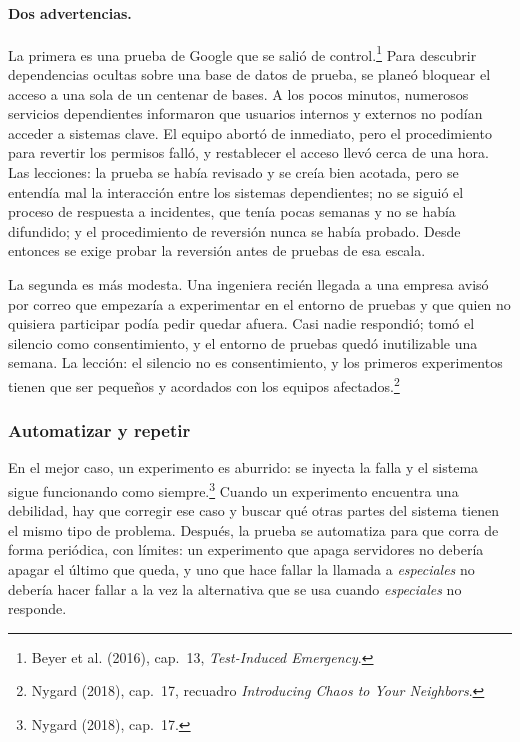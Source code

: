 \documentclass[variant=apuntes,cover=institutional,mode=screen]{ua-engineering-v6-article}
\begin{document}
\paragraph{Dos advertencias.} La primera es una prueba de Google que se salió de control.\footnote{Beyer et al. (2016), cap.~13, \emph{Test-Induced Emergency}.} Para descubrir dependencias ocultas sobre una base de datos de prueba, se planeó bloquear el acceso a una sola de un centenar de bases. A los pocos minutos, numerosos servicios dependientes informaron que usuarios internos y externos no podían acceder a sistemas clave. El equipo abortó de inmediato, pero el procedimiento para revertir los permisos falló, y restablecer el acceso llevó cerca de una hora. Las lecciones: la prueba se había revisado y se creía bien acotada, pero se entendía mal la interacción entre los sistemas dependientes; no se siguió el proceso de respuesta a incidentes, que tenía pocas semanas y no se había difundido; y el procedimiento de reversión nunca se había probado. Desde entonces se exige probar la reversión antes de pruebas de esa escala.

La segunda es más modesta. Una ingeniera recién llegada a una empresa avisó por correo que empezaría a experimentar en el entorno de pruebas y que quien no quisiera participar podía pedir quedar afuera. Casi nadie respondió; tomó el silencio como consentimiento, y el entorno de pruebas quedó inutilizable una semana. La lección: el silencio no es consentimiento, y los primeros experimentos tienen que ser pequeños y acordados con los equipos afectados.\footnote{Nygard (2018), cap.~17, recuadro \emph{Introducing Chaos to Your Neighbors}.}

\subsubsection{Automatizar y repetir}

En el mejor caso, un experimento es aburrido: se inyecta la falla y el sistema sigue funcionando como siempre.\footnote{Nygard (2018), cap.~17.} Cuando un experimento encuentra una debilidad, hay que corregir ese caso y buscar qué otras partes del sistema tienen el mismo tipo de problema. Después, la prueba se automatiza para que corra de forma periódica, con límites: un experimento que apaga servidores no debería apagar el último que queda, y uno que hace fallar la llamada a \emph{especiales} no debería hacer fallar a la vez la alternativa que se usa cuando \emph{especiales} no responde.
\end{document}

